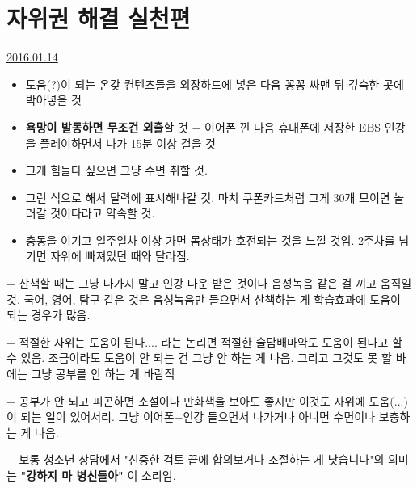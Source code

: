 \section{자위권 해결 실천편}
\href{https://www.kockoc.com/Apoc/587686}{2016.01.14}

\vspace{5mm}

\begin{itemize}
    \item 도움(?)이 되는 온갖 컨텐츠들을 외장하드에 넣은 다음 꽁꽁 싸맨 뒤 깊숙한 곳에 박아넣을 것
    \vspace{5mm}
    
    \item \textbf{욕망이 발동하면 무조건 외출}할 것 $-$ 이어폰 낀 다음 휴대폰에 저장한 EBS 인강을 플레이하면서 나가 15분 이상 걸을 것
    \vspace{5mm}
    
    \item 그게 힘들다 싶으면 그냥 수면 취할 것.
    \vspace{5mm}
    
    \item 그런 식으로 해서 달력에 표시해나갈 것. 마치 쿠폰카드처럼 그게 30개 모이면 놀러갈 것이다라고 약속할 것.
    \vspace{5mm}
    
    \item 충동을 이기고 일주일차 이상 가면 몸상태가 호전되는 것을 느낄 것임. 2주차를 넘기면 자위에 빠져있던 때와 달라짐.
    \vspace{5mm}
\end{itemize}

+ 산책할 때는 그냥 나가지 말고 인강 다운 받은 것이나 음성녹음 같은 걸 끼고 움직일 것.
국어, 영어, 탐구 같은 것은 음성녹음만 들으면서 산책하는 게 학습효과에 도움이 되는 경우가 많음.
\vspace{5mm}

+ 적절한 자위는 도움이 된다.... 라는 논리면 적절한 술담배마약도 도움이 된다고 할 수 있음.
조금이라도 도움이 안 되는 건 그냥 안 하는 게 나음. 그리고 그것도 못 할 바에는 그냥 공부를 안 하는 게 바람직
\vspace{5mm}

+ 공부가 안 되고 피곤하면 소설이나 만화책을 보아도 좋지만 이것도 자위에 도움(...)이 되는 일이 있어서리.
그냥 이어폰$-$인강 들으면서 나가거나 아니면 수면이나 보충하는 게 나음.
\vspace{5mm}

+ 보통 청소년 상담에서 "신중한 검토 끝에 합의보거나 조절하는 게 낫습니다"의 의미는 \textbf{"걍하지 마 병신들아"} 이 소리임.
\vspace{5mm}






